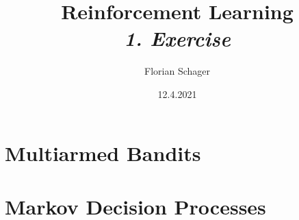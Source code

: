 \documentclass{article}
\title
{
  Reinforcement Learning \\
  \vspace{4pt}
  \normalsize
  \textit{1. Exercise}
}
\author
{
  Florian Schager
}
\date{12.4.2021}
\begin{document}
\maketitle

\section{Multiarmed Bandits}








\section{Markov Decision Processes}
















\end{document}
